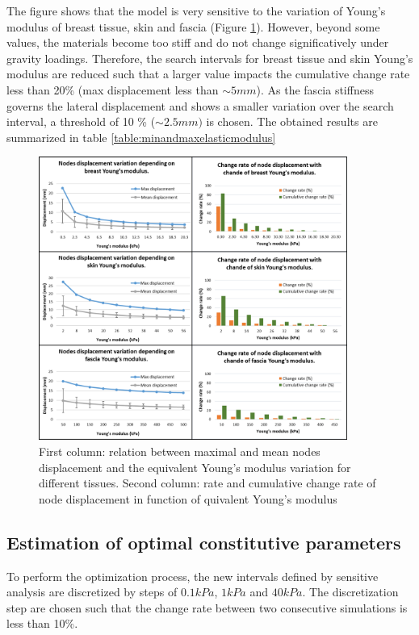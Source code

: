 The figure shows that the model is very sensitive to the variation of Young’s modulus of breast tissue, skin and fascia (Figure \ref{fig:materialPropDiscretization}). However, beyond some values, the materials become too stiff and do not change significatively under gravity loadings.  Therefore, the search intervals for breast tissue and skin Young’s modulus are reduced such that a larger value impacts the cumulative change rate less than 20\% (max displacement less than $\sim 5mm$). As the fascia stiffness governs the lateral displacement and shows a smaller variation over the search interval, a threshold of 10 \% ($\sim 2.5mm)$ is chosen. The obtained results are summarized in table \ref{table:minandmaxelasticmodulus} 

\begin{figure}[!h]
\centering
\includegraphics[width=0.9\textwidth,keepaspectratio]{figures/materialPropDiscretization.png} 
\caption{First column: relation between maximal and mean nodes displacement and the equivalent Young's modulus variation for different tissues. Second column: rate and cumulative change rate of node displacement in function of quivalent Young's modulus}\label{fig:materialPropDiscretization}
\end{figure}

\subsection{Estimation of optimal constitutive parameters}
To perform the optimization process, the new intervals defined by sensitive analysis are discretized by steps of $0.1 kPa$, $1kPa$ and $40 kPa$. The discretization step are chosen such that the change rate between two consecutive simulations is less than 10\%.

